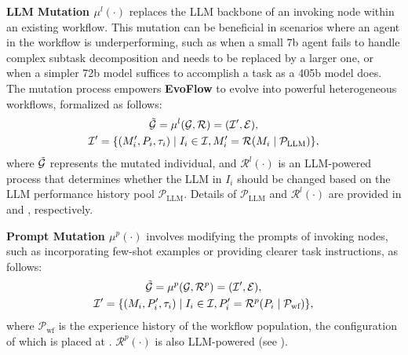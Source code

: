 \documentclass{article}
\theoremstyle{plain}
\theoremstyle{definition}
\theoremstyle{remark}
\newcommand{\ourmethod}{{\fontfamily{lmtt}\selectfont \textbf{EvoFlow}}\xspace}
\begin{document}
\textbf{LLM Mutation $\mu^{l}(\cdot)$} replaces the LLM backbone of an invoking node within an existing workflow. This mutation can be beneficial in scenarios where an agent in the workflow is underperforming, such as when a small 7b agent fails to handle complex subtask decomposition and needs to be replaced by a larger one, or when a simpler 72b model suffices to accomplish a task as a 405b model does. The mutation process empowers \ourmethod to evolve into powerful heterogeneous workflows, formalized as follows:  
\begin{equation}
\label{eq:llm-mutation}
\begin{gathered}
\Tilde{\mathcal{G}} = \mu^{l}(\mathcal{G},\mathcal{R}) = (\mathcal{I}',\mathcal{E}),\\
\mathcal{I}' = \{(M_i', P_i, \tau_i) \mid I_i  \in \mathcal{I}, M_i' = \mathcal{R}(M_i\mid \mathcal{P}_\text{LLM})\},
\end{gathered}
\end{equation}  
where \(\Tilde{\mathcal{G}}\) represents the mutated individual, and  \(\mathcal{R}^l(\cdot)\) is an LLM-powered process that determines whether the LLM in \(I_i\) should be changed based on the LLM performance history pool \(\mathcal{P}_\text{LLM}\). Details of \(\mathcal{P}_\text{LLM}\) and \(\mathcal{R}^l(\cdot)\) are provided in  and , respectively.

\textbf{Prompt Mutation $\mu^{p}(\cdot)$} involves modifying the prompts of invoking nodes, such as incorporating few-shot examples or providing clearer task instructions, as follows:  
\begin{equation}
\label{eq:prompt-mutation}
\begin{gathered}
\small
\Tilde{\mathcal{G}} = \mu^{p}(\mathcal{G},\mathcal{R}^p) = (\mathcal{I}',\mathcal{E}),\\
\mathcal{I}' = \{(M_i, P_i', \tau_i) \mid I_i  \in \mathcal{I}, P_i' = \mathcal{R}^p(P_i\mid \mathcal{P}_\text{wf})\},
\end{gathered}
\end{equation}
where $\mathcal{P}_\text{wf}$ is the experience history of the workflow population, the configuration of which is placed at . $\mathcal{R}^p(\cdot)$ is also LLM-powered (see ).
\end{document}
